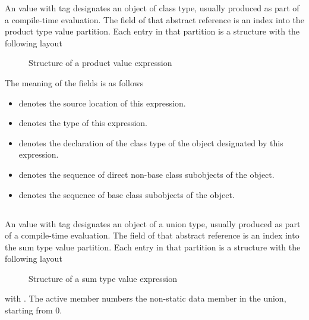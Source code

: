 An  value with tag  designates an object of class type, usually produced as part of a compile-time evaluation.
The  field of that abstract reference is an index into the product type value partition.  Each entry in that partition is a structure with the following layout
%
\begin{figure}[H]
	\centering
	\caption{Structure of a product value expression}
	\label{fig:ifc-product-value-structure}
\end{figure}
%
The meaning of the fields is as follows
\begin{itemize}
	\item {} denotes the source location of this expression.
	\item {} denotes the type of this expression.
	\item {} denotes the declaration of the class type of the object designated by this expression.
	\item {} denotes the sequence of direct non-base class subobjects of the object.
	\item {} denotes the sequence of base class subobjects of the object.
\end{itemize}



\subsection{}
\label{sec:ifc:ExprSort:SumTypeValue}

An  value with tag  designates an object of a union type, usually produced as part of a compile-time evaluation.
The  field of that abstract reference is an index into the sum type value partition.  Each entry in that partition is a structure with the following layout
%
\begin{figure}[H]
	\centering
	\caption{Structure of a sum type value expression}
	\label{fig:ifc:ExprSort:SumTypeValue}
\end{figure}
%
with .  The active member numbers the non-static data member in the union, starting from $0$.

